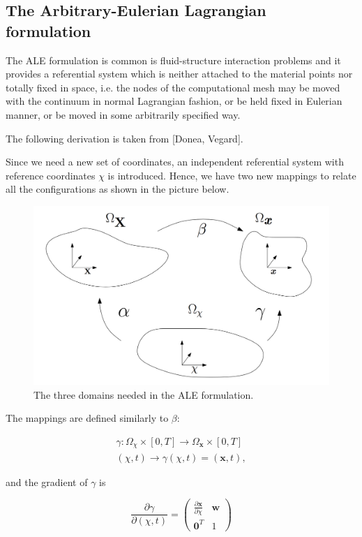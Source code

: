 \documentclass[a4paper,11pt,openright,twoside]{book}
\begin{document}
\subsection{The Arbitrary-Eulerian Lagrangian formulation}
The ALE formulation is common is fluid-structure interaction problems and it provides a referential system which is neither attached to the material points nor totally fixed in space, i.e. the nodes of the computational mesh may be moved with the continuum in normal Lagrangian fashion, or be held fixed in Eulerian manner, or be moved in some arbitrarily specified way.

The following derivation is taken from [Donea, Vegard].

Since we need a new set of coordinates, an independent referential system with reference coordinates $\chi$ is introduced. Hence, we have two new mappings to relate all the configurations as shown in the picture below.

\begin{figure}[h!]
\centering
\includegraphics[width=\textwidth]{images/ALE2}
\caption{The three domains needed in the ALE formulation.}
\end{figure}

The mappings are defined similarly to $\beta$:

\begin{align*}
\gamma : \Omega_{\chi} \times [0, T]  \rightarrow \Omega_\mathbf{x} \times [0, T] \\
(\chi , t)  \rightarrow \gamma(\chi, t) = (\mathbf{x}, t),
\end{align*}


and the gradient of $\gamma$ is 

\begin{equation}
\frac{\partial \gamma}{\partial(\chi, t)} = 
\begin{pmatrix}
\frac{\partial \mathbf{x}}{\partial \chi} & \mathbf{w} \\
\mathbf{0}^T & 1
\end{pmatrix}
\end{equation}
\end{document}
